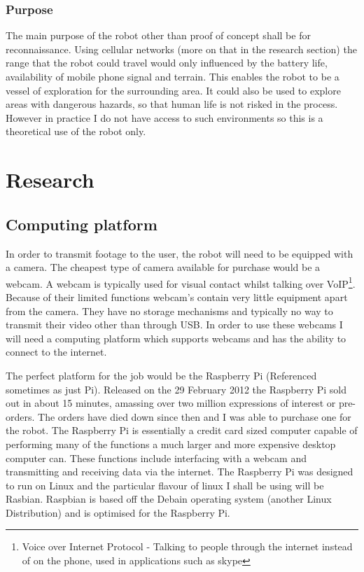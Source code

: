 \documentclass[]{report}   %
\begin{document}
				\subsection{Purpose}
					The main purpose of the robot other than proof of concept shall be for reconnaissance. Using cellular
					networks (more on that in the research section) the range that the robot could travel would only influenced by
					the battery life, availability of mobile phone signal and terrain. This enables the robot to be a vessel of
					exploration for the surrounding area. It could also be used to explore areas with dangerous hazards, so that
					human life is not risked in the process. However in practice I do not have access to such environments so this
					is a theoretical use of the robot only.
		
		\chapter{Research}
			\section{Computing platform}
				In order to transmit footage to the user, the robot will need to be equipped with a camera. The cheapest type of camera
				available for purchase would be a webcam. A webcam is typically used for visual contact whilst talking over
				VoIP\footnote{Voice over Internet Protocol - Talking to people through the internet instead of on the phone, used in
					applications such as skype}.
				Because of their limited functions webcam's contain very little equipment apart from the camera. They have no storage mechanisms
				and typically no way to transmit their video other than through USB. In order to use these webcams I will need a computing
				platform which supports webcams and has the ability to connect to the internet.
				
				The perfect platform for the job would be the Raspberry Pi (Referenced sometimes as just Pi). Released on the 29 February 2012 the Raspberry Pi sold out in about
				15 minutes, amassing over two million expressions of interest or pre-orders\cite{rasporder}. The orders have died down since then
				and I was able to purchase one for the robot. The Raspberry Pi is essentially a credit card sized computer capable of performing
				many of the functions a much larger and more expensive desktop computer can. These functions include interfacing with a webcam and
				transmitting and receiving data via the internet. The Raspberry Pi was designed to run on Linux and the particular flavour of linux
				I shall be using will be Rasbian. Raspbian is based off the Debain operating system (another Linux Distribution) and is optimised
				for the Raspberry Pi.
\end{document}
